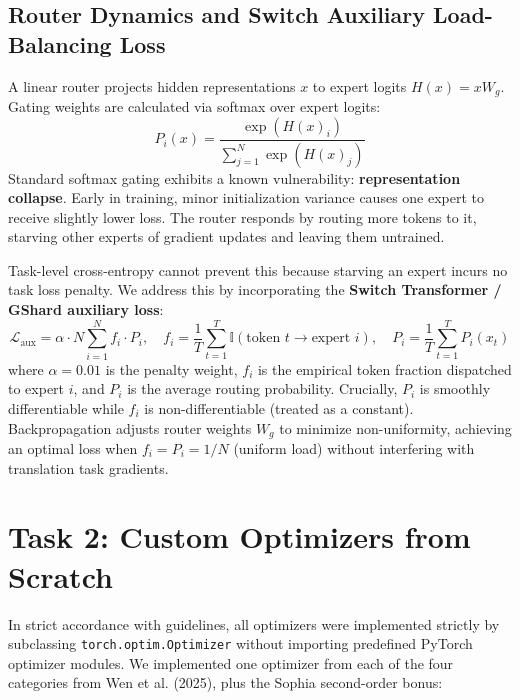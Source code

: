\documentclass[11pt,a4paper]{article}
\begin{document}
\subsection{Router Dynamics and Switch Auxiliary Load-Balancing Loss}
A linear router projects hidden representations $x$ to expert logits $H(x) = x W_g$. Gating weights are calculated via softmax over expert logits:
\begin{equation}
P_i(x) = \frac{\exp(H(x)_i)}{\sum_{j=1}^N \exp(H(x)_j)}
\end{equation}
Standard softmax gating exhibits a known vulnerability: \textbf{representation collapse}. Early in training, minor initialization variance causes one expert to receive slightly lower loss. The router responds by routing more tokens to it, starving other experts of gradient updates and leaving them untrained.

Task-level cross-entropy cannot prevent this because starving an expert incurs no task loss penalty. We address this by incorporating the \textbf{Switch Transformer / GShard auxiliary loss}:
\begin{equation}
\mathcal{L}_{\text{aux}} = \alpha \cdot N \sum_{i=1}^N f_i \cdot P_i, \quad f_i = \frac{1}{T} \sum_{t=1}^T \mathbb{I}(\text{token } t \to \text{expert } i), \quad P_i = \frac{1}{T} \sum_{t=1}^T P_i(x_t)
\end{equation}
where $\alpha = 0.01$ is the penalty weight, $f_i$ is the empirical token fraction dispatched to expert $i$, and $P_i$ is the average routing probability. Crucially, $P_i$ is smoothly differentiable while $f_i$ is non-differentiable (treated as a constant). Backpropagation adjusts router weights $W_g$ to minimize non-uniformity, achieving an optimal loss when $f_i = P_i = 1/N$ (uniform load) without interfering with translation task gradients.

\section{Task 2: Custom Optimizers from Scratch}

In strict accordance with guidelines, all optimizers were implemented strictly by subclassing \texttt{torch.optim.Optimizer} without importing predefined PyTorch optimizer modules. We implemented one optimizer from each of the four categories from Wen et al. (2025), plus the Sophia second-order bonus:
\end{document}
